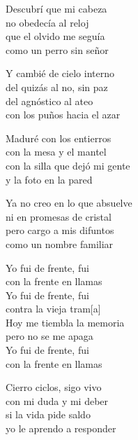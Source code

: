 \begin{lyrics}
Descubrí que mi cabeza\\
no obedecía al reloj\\
que el olvido me seguía\\
como un perro sin señor

Y cambié de cielo interno\\
del quizás al no, sin paz\\
del agnóstico al ateo\\
con los puños hacia el azar

Maduré con los entierros\\
con la mesa y el mantel\\
con la silla que dejó mi gente\\
y la foto en la pared

Ya no creo en lo que absuelve\\
ni en promesas de cristal\\
pero cargo a mis difuntos\\
como un nombre familiar

Yo fui de frente, fui\\
con la frente en llamas\\
Yo fui de frente, fui\\
contra la vieja tram[a]\\
Hoy me tiembla la memoria\\
pero no se me apaga\\
Yo fui de frente, fui\\
con la frente en llamas

Cierro ciclos, sigo vivo\\
con mi duda y mi deber\\
si la vida pide saldo\\
yo le aprendo a responder
\end{lyrics}

